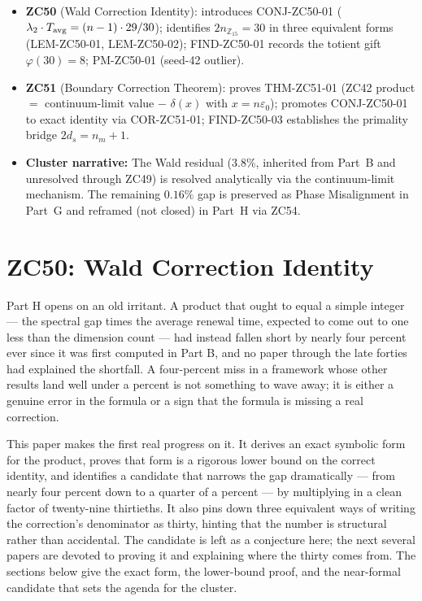 \documentclass[12pt, a4paper]{article}
\begin{document}
\begin{keybox}[title={Part XXXVIII Overview}]
\begin{itemize}[leftmargin=1.5em]
\item \textbf{ZC50} (Wald Correction Identity): introduces
  CONJ-ZC50-01 ($\lambda_2\cdot T_{\rm avg} = (n-1)\cdot 29/30$);
  identifies $2n_{\mathbb{Z}_{15}}=30$ in three equivalent forms
  (LEM-ZC50-01, LEM-ZC50-02); FIND-ZC50-01 records the totient
  gift $\varphi(30)=8$; PM-ZC50-01 (seed-42 outlier).
\item \textbf{ZC51} (Boundary Correction Theorem): proves
  THM-ZC51-01 (ZC42 product $=$ continuum-limit value $-$
  $\delta(x)$ with $x=n\varepsilon_0$); promotes CONJ-ZC50-01 to
  exact identity via COR-ZC51-01; FIND-ZC50-03 establishes the
  primality bridge $2d_s=n_m+1$.
\item \textbf{Cluster narrative:}
  The Wald residual ($3.8\%$, inherited from Part~B and unresolved
  through ZC49) is resolved analytically via the continuum-limit
  mechanism. The remaining $0.16\%$ gap is preserved as
  Phase Misalignment in Part~G and reframed (not closed) in Part~H
  via ZC54.
\end{itemize}
\end{keybox}



\section{ZC50: Wald Correction Identity}

Part H opens on an old irritant. A product that ought to equal a simple integer ---
the spectral gap times the average renewal time, expected to come out to one less
than the dimension count --- had instead fallen short by nearly four percent ever
since it was first computed in Part B, and no paper through the late forties had
explained the shortfall. A four-percent miss in a framework whose other results
land well under a percent is not something to wave away; it is either a genuine
error in the formula or a sign that the formula is missing a real correction.

This paper makes the first real progress on it. It derives an exact symbolic form
for the product, proves that form is a rigorous lower bound on the correct
identity, and identifies a candidate that narrows the gap dramatically --- from
nearly four percent down to a quarter of a percent --- by multiplying in a clean
factor of twenty-nine thirtieths. It also pins down three equivalent ways of
writing the correction's denominator as thirty, hinting that the number is
structural rather than accidental. The candidate is left as a conjecture here;
the next several papers are devoted to proving it and explaining where the thirty
comes from. The sections below give the exact form, the lower-bound proof, and
the near-formal candidate that sets the agenda for the cluster.
\label{sec:zc50}
\end{document}
